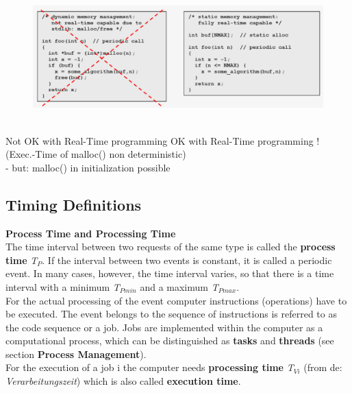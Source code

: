 	\begin{figure}[h]
    \centering
    \includegraphics[width=15cm, height=5cm]{Images/image74.png}
    \label{fig:Fig }
    \end{figure}
    
Not OK with Real-Time programming   \hspace{3cm}  OK with Real-Time programming !\\
(Exec.-Time of malloc() non deterministic)\\
- but: malloc() in initialization possible  

\subsection{  Timing Definitions}

{\rot\bf Process Time and Processing Time}\\

The time interval between two requests of the same type is called the \textbf{process time} \textit{T${}_{P}$}. If the interval between two events is constant, it is called a periodic event. In many cases, however, the time interval varies, so that there is a time interval with a minimum \textit{T${}_{Pmin}$} and a maximum \textit{T${}_{Pmax}$}.\\

For the actual processing of the event computer instructions (operations) have to be executed. The event belongs to the sequence of instructions is referred to as the code sequence or a job. Jobs are implemented within the computer as a computational process, which can be distinguished as \textbf{tasks} and \textbf{threads} (see section \textbf{Process Management}). \\

For the execution of a job i the computer needs \textbf{processing time} \textit{T${}_{Vi}$} (from de: \textit{Verarbeitungszeit}) which is also called \textbf{execution time}.\\

